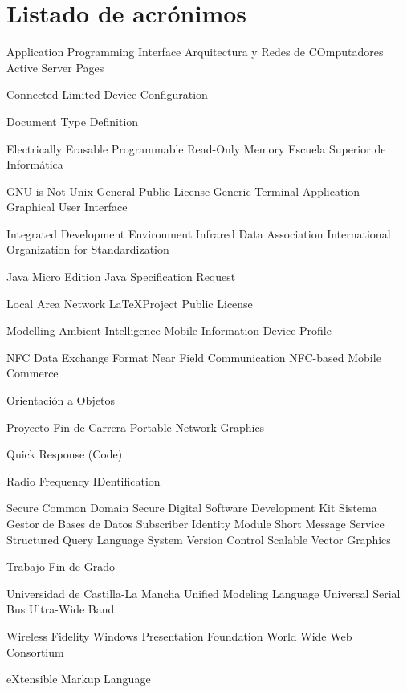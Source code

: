 
\chapter{Listado de acrónimos}

{\small
\begin{acronym}[XXXXXXXX]
       {Application Programming Interface}
      {Arquitectura y Redes de COmputadores}
       {Active Server Pages}

      {Connected Limited Device Configuration}

       {Document Type Definition}

    {Electrically Erasable Programmable Read-Only Memory}
       {Escuela Superior de Informática}

       {GNU is Not Unix}
       {General Public License}
       {Generic Terminal Application}
       {Graphical User Interface}

       {Integrated Development Environment}
      {Infrared Data Association}
       {International Organization for Standardization}

    {Java Micro Edition}
       {Java Specification Request}

       {Local Area Network}
      {\LaTeX Project Public License}

      {Modelling Ambient Intelligence}
      {Mobile Information Device Profile}

      {NFC Data Exchange Format}
       {Near Field Communication}
       {NFC-based Mobile Commerce}

        {Orientación a Objetos}

       {Proyecto Fin de Carrera}
       {Portable Network Graphics}
  
        {Quick Response (Code)}

      {Radio Frequency IDentification}

       {Secure Common Domain}
        {Secure Digital}
       {Software Development Kit}
      {Sistema Gestor de Bases de Datos}
       {Subscriber Identity Module}
       {Short Message Service}
       {Structured Query Language}
       {System Version Control}
       {Scalable Vector Graphics}

       {Trabajo Fin de Grado}

      {Universidad de Castilla-La Mancha}
       {Unified Modeling Language}
       {Universal Serial Bus}
       {Ultra-Wide Band}

      {Wireless Fidelity}
       {Windows Presentation Foundation}
       {World Wide Web Consortium}

       {eXtensible Markup Language}
\end{acronym}
}


